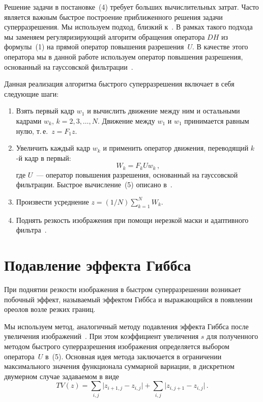 \begin{multicols}{2}
     Решение задачи в постановке~(4) требует больших вычислительных затрат. Часто
является важным быстрое построение приближенного решения задачи
суперразрешения. Мы используем подход, близкий к~\cite{16nas}. В рамках такого
подхода мы заменяем регуляризирующий алгоритм обращения оператора $DH$ из
формулы~(1) на прямой оператор повышения разрешения~$U$. В качестве этого
оператора мы в данной работе используем оператор повышения разрешения,
основанный на гауссовской фильтрации~\cite{17nas}.

     Данная реализация алгоритма быстрого суперразрешения включает в себя
следующие шаги:
     \begin{enumerate}[1.]
     \item Взять первый кадр $w_1$ и вычислить движение между ним и остальными
кадрами $w_k$, $k=2, 3, \ldots , N$. Движение между $w_1$ и $w_1$ принимается
равным нулю, т.\,е.\ $z=F_1z$.
     \item Увеличить каждый кадр $w_k$ и применить оператор движения,
переводящий $k$-й кадр в первый:
     \begin{equation}
     W_k=F_k U w_k\,,
     \label{e5nas}
     \end{equation}
где $U$~--- оператор повышения разрешения, основанный на гауссовской фильтрации.
Быст\-рое вычисление~(5) описано в~\cite{17nas}.
     \item Произвести усреднение $z=(1/N)\sum\limits_{k=1}^N W_k$.
     \item Поднять резкость изображения при помощи нерезкой маски и адаптивного
фильтра~\cite{18nas}.
     \end{enumerate}

     \section{Подавление эффекта Гиббса}

     При поднятии резкости изображения в быстром суперразрешении возникает
побочный эффект, называемый эффектом Гиббса и выражающийся в появлении
ореолов возле резких границ.

     Мы используем метод, аналогичный методу подавления эффекта Гиббса после
увеличения изображений~\cite{19nas}. При этом коэффициент увеличения $s$ для
полученного методом быстрого суперразрешения изображения определяется выбором
оператора~$U$ в~(5). Основная идея метода заключается в ограничении
максимального значения функционала суммарной вариации, в дискретном двумерном
случае задаваемом в виде
     $$
     TV(z) = \sum\limits_{i,j} \vert  z_{i+1,j}-z_{i,j} \vert +
\sum\limits_{i,j} \vert z_{i,j+1}- z_{i,j}\vert\,.
     $$


\end{multicols}
